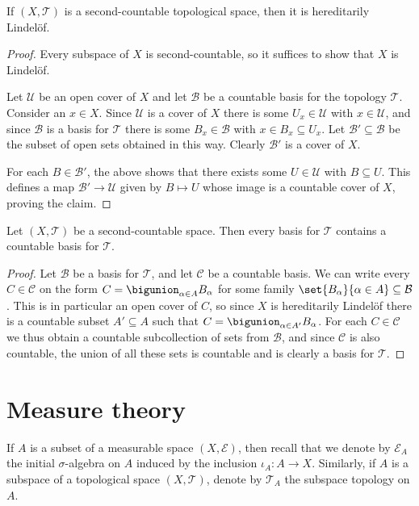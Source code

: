 \documentclass[article, a4paper, 11pt, oneside]{memoir}
\numberwithin{equation}{chapter}
\newcommand{\calT}{\mathcal{T}}
\newcommand{\calU}{\mathcal{U}}
\newcommand{\calB}{\mathcal{B}}
\newcommand{\calE}{\mathcal{E}}
\newcommand{\calC}{\mathcal{C}}
\begin{document}
\begin{proposition}
    If $(X,\calT)$ is a second-countable topological space, then it is hereditarily Lindelöf.
\end{proposition}

\begin{proof}
    Every subspace of $X$ is second-countable, so it suffices to show that $X$ is Lindelöf.
    
    Let $\calU$ be an open cover of $X$ and let $\calB$ be a countable basis for the topology $\calT$. Consider an $x \in X$. Since $\calU$ is a cover of $X$ there is some $U_x \in \calU$ with $x \in \calU$, and since $\calB$ is a basis for $\calT$ there is some $B_x \in \calB$ with $x \in B_x \subseteq U_x$. Let $\calB' \subseteq \calB$ be the subset of open sets obtained in this way. Clearly $\calB'$ is a cover of $X$.
    
    For each $B \in \calB'$, the above shows that there exists some $U \in \calU$ with $B \subseteq U$. This defines a map $\calB' \to \calU$ given by $B \mapsto U$ whose image is a countable cover of $X$, proving the claim.
\end{proof}


\begin{lemma}
    \label{thm:countable_basis}
    Let $(X, \calT)$ be a second-countable space. Then every basis for $\calT$ contains a countable basis for $\calT$.
\end{lemma}

\begin{proof}
    Let $\calB$ be a basis for $\calT$, and let $\calC$ be a countable basis. We can write every $C \in \calC$ on the form $C = \bigunion_{\alpha \in A} B_\alpha$ for some family $\set{B_\alpha}{\alpha \in A} \subseteq \calB$. This is in particular an open cover of $C$, so since $X$ is hereditarily Lindelöf there is a countable subset $A' \subseteq A$ such that $C = \bigunion_{\alpha \in A'} B_\alpha$. For each $C \in \calC$ we thus obtain a countable subcollection of sets from $\calB$, and since $\calC$ is also countable, the union of all these sets is countable and is clearly a basis for $\calT$.
\end{proof}





\chapter{Measure theory}

If $A$ is a subset of a measurable space $(X, \calE)$, then recall that we denote by $\calE_A$ the initial $\sigma$-algebra on $A$ induced by the inclusion $\iota_A \colon A \to X$. Similarly, if $A$ is a subspace of a topological space $(X, \calT)$, denote by $\calT_A$ the subspace topology on $A$.
\end{document}
